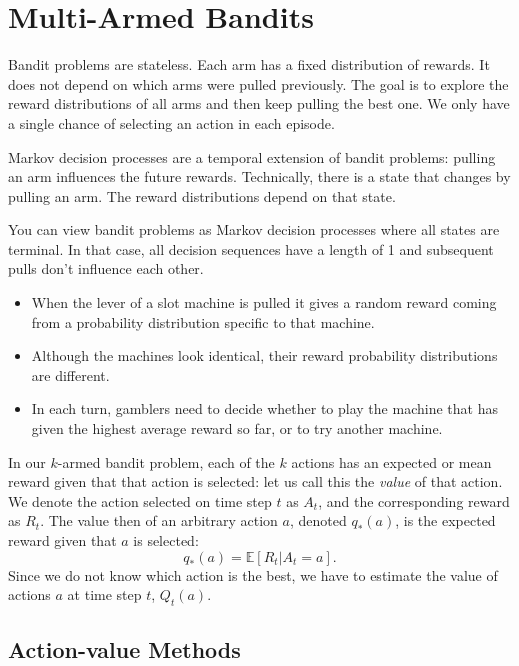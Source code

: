 \section{Multi-Armed Bandits}


Bandit problems are stateless. Each arm has a fixed distribution of rewards. It does not depend on which arms were pulled previously. The goal is to explore the reward distributions of all arms and then keep pulling the best one. We only have a single chance of selecting an action in each episode. 

Markov decision processes are a temporal extension of bandit problems: pulling an arm influences the future rewards. Technically, there is a state that changes by pulling an arm. The reward distributions depend on that state.

You can view bandit problems as Markov decision processes where all states are terminal. In that case, all decision sequences have a length of 1 and subsequent pulls don't influence each other.

\begin{itemize}
	\item When the lever of a slot machine is pulled it gives a random reward coming from a probability distribution specific to that machine.
	\item Although the machines look identical, their reward probability distributions are different. 
	\item In each turn, gamblers need to decide whether to play the machine that has given the highest average reward so far, or to try another machine. 
\end{itemize}

In our $k$-armed bandit problem, each of the $k$ actions has an expected or mean reward given that that action is selected: let us call this the \textit{value} of that action. We denote the action selected on time step $t$ as $A_t$, and the corresponding reward as $R_t$. The value then of an arbitrary action $a$, denoted $q_*(a)$, is the expected reward given that $a$ is selected:
$$q_*(a) = \mathbb{E}[R_t|A_t=a].$$
Since we do not know which action is the best, we have to estimate the value of actions $a$ at time step $t$, $Q_t(a)$.

\subsection{Action-value Methods}

